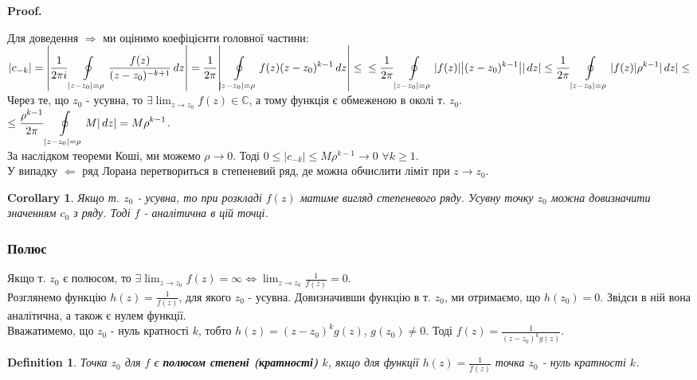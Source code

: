 \documentclass[a4paper, 10pt]{article}
\makeatletter
\def\qed{$\blacksquare$}
\theoremstyle{theoremdd}
\theoremstyle{theoremdd}
\newtheorem{definition}[theorem]{Definition}
\theoremstyle{theoremdd}
\theoremstyle{theoremdd}
\theoremstyle{theoremdd}
\theoremstyle{theoremdd}
\theoremstyle{theoremdd}
\theoremstyle{theoremdd}
\newtheorem{corollary}[theorem]{Corollary}
\renewenvironment{proof}[1][Proof.\\]{\par
\pushQED{\hfill \qed}%
\normalfont \topsep6\p@\@plus6\p@\relax
\trivlist
\item\relax
{\bfseries
#1\@addpunct{.}}\hspace\labelsep\ignorespaces
}{%
\popQED\endtrivlist\@endpefalse
}
\makeatother
\begin{document}
\begin{proof}
Для доведення $\boxed{\Rightarrow}$ ми оцінимо коефіцієнти головної частини:\\
	 $\displaystyle \abs{c_{-k}} = \abs{\frac{1}{2 \pi i}\oint\displaylimits_{|z-z_0|=\rho} \frac{f(z)}{(z-z_0)^{-k+1}} \,dz} = \frac{1}{2 \pi}\abs{\oint\displaylimits_{|z-z_0|=\rho} f(z)(z-z_0)^{k-1} \,dz} \leq \\ \leq \frac{1}{2 \pi}\oint\displaylimits_{|z-z_0|=\rho} \abs{f(z)} \abs{(z-z_0)^{k-1}} \abs{\,dz} \leq \frac{1}{2 \pi}\oint\displaylimits_{|z-z_0|=\rho} \abs{f(z)} \rho^{k-1} \abs{\,dz} \leq$\\
	 Через те, що $z_0$ - усувна, то $\displaystyle\exists \lim_{z \to z_0} f(z) \in \mathbb{C}$, а тому функція є обмеженою в околі т. $z_0$.\\
	 $\leq \displaystyle \frac{\rho^{k-1}}{2 \pi}\oint\displaylimits_{|z-z_0|=\rho} M  \abs{\,dz} = M \rho^{k-1}$.\\
За наслідком теореми Коші, ми можемо $\rho \to 0$. Тоді $0\leq|c_{-k}|\leq M \rho^{k-1} \to 0$ $\forall k \geq 1$.
\bigskip \\
У випадку $\boxed{\Leftarrow}$ ряд Лорана перетвориться в степеневий ряд, де можна обчислити ліміт при $z \to z_0$.
\end{proof}

\begin{corollary}
Якщо т. $z_0$ - усувна, то при розкладі $f(z)$ матиме вигляд степеневого ряду. Усувну точку $z_0$ можна довизначити значенням $c_0$ з ряду. Тоді $f$ - аналітична в цій точці.
\end{corollary}

	 
\subsubsection{Полюс}
Якщо т. $z_0$ є полюсом, то $\displaystyle\exists \lim_{z \to z_0} f(z) = \infty \iff \lim_{z \to z_0} \frac{1}{f(z)} = 0$.\\
	 Розглянемо функцію $h(z) = \displaystyle \frac{1}{f(z)}$, для якого $z_0$ - усувна. Довизначивши функцію в т. $z_0$, ми отримаємо, що $h(z_0) = 0$. Звідси в ній вона аналітична, а також є нулем функції.\\
	 Вважатимемо, що $z_0$ - нуль кратності $k$, тобто $h(z)=(z-z_0)^k g(z)$, $g(z_0) \neq 0$. Тоді $\displaystyle f(z)=\frac{1}{(z-z_0)^k g(z)}$.
	 
\begin{definition}
Точка $z_0$ для $f$ є \textbf{полюсом степені (кратності)} $k$, якщо для функції $\displaystyle h(z)=\frac{1}{f(z)}$ точка $z_0$ - нуль кратності $k$.
\end{definition}
\end{document}
